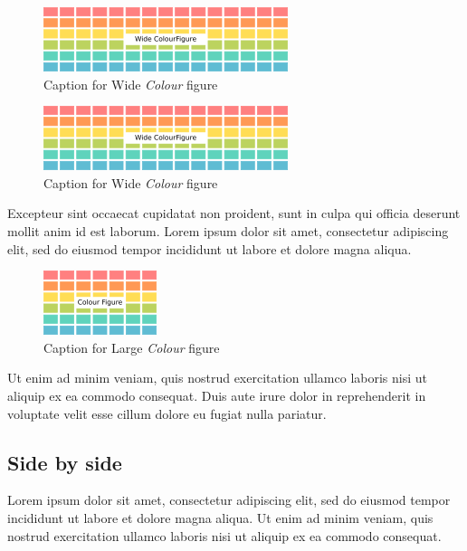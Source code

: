 \documentclass[10pt,conference,a4paper,onecolumn] {IEEEtran}
\begin{document}
\begin{figure}[h]
\centering
\includegraphics[scale=0.9]{wide-colour.png}
\caption{Caption for Wide \textit{Colour} figure}
\label{network}
\end{figure}

\begin{multicols}{2} 

\begin{figure}
\centering
\includegraphics[scale=0.9]{wide-colour.png}
\caption{Caption for Wide \textit{Colour} figure}
\label{network}
\end{figure}

\newpage

Excepteur sint occaecat cupidatat non proident, sunt in culpa qui officia deserunt mollit anim id est laborum. Lorem ipsum dolor sit amet, consectetur adipiscing elit, sed do eiusmod tempor incididunt ut labore et dolore magna aliqua. 

\begin{figure}[H]
\centering
\includegraphics[scale=0.9]{colour.png}
\caption{Caption for Large \textit{Colour} figure}
\label{network}
\end{figure}

Ut enim ad minim veniam, quis nostrud exercitation ullamco laboris nisi ut aliquip ex ea commodo consequat. Duis aute irure dolor in reprehenderit in voluptate velit esse cillum dolore eu fugiat nulla pariatur.

\subsection{Side by side}

Lorem ipsum dolor sit amet, consectetur adipiscing elit, sed do eiusmod tempor incididunt ut labore et dolore magna aliqua. Ut enim ad minim veniam, quis nostrud exercitation ullamco laboris nisi ut aliquip ex ea commodo consequat. 


\end{multicols}
\end{document}
